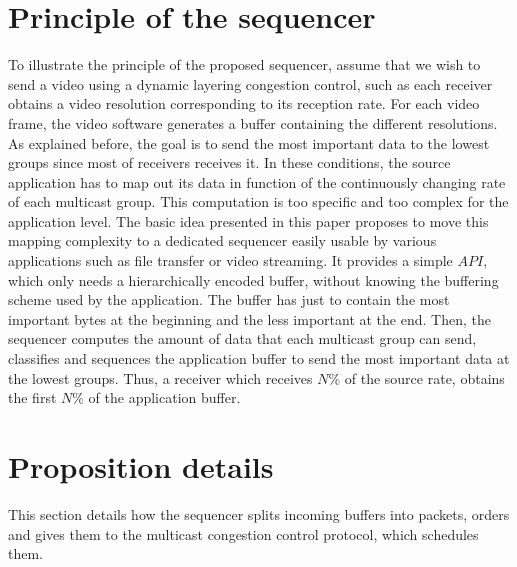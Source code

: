 \documentclass[a4paper]{article}
\begin{document}
\section{Principle of the sequencer}
    To illustrate the principle of the proposed sequencer, assume that we wish
    to send a video using a dynamic layering congestion control, such as each
    receiver obtains a video resolution corresponding to its reception rate.
    For each video frame, the video software generates a buffer containing the
    different resolutions.  As explained before, the goal is to send the most
    important data to the lowest groups since most of receivers receives it. In
    these conditions, the source application has to map out its data in function
    of the continuously changing rate of each multicast group.
This computation is too specific and too complex for the application level.
    The basic idea presented in this paper proposes to move this mapping
    complexity to a dedicated sequencer easily usable by various applications
    such as file transfer or video streaming.  It provides a simple $API$, which
    only needs a hierarchically encoded buffer, without knowing the buffering
    scheme used by the application. The buffer has just to contain the most
    important bytes at the beginning and the less important at the end.
Then, the sequencer computes the amount of data that each multicast group
    can send, classifies and sequences the application buffer to send the most
    important data at the lowest groups.  Thus, a receiver which receives $N$\%
    of the source rate, obtains the first $N\%$ of the application buffer.

\section{Proposition details}
    This section details how the sequencer splits incoming buffers into
    packets, orders and gives them to the multicast congestion control protocol,
    which schedules them.
\end{document}
